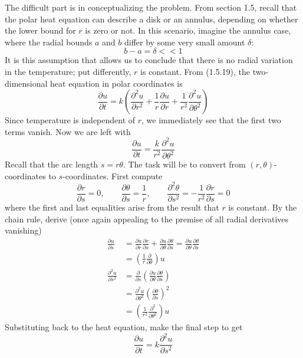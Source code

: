 \documentclass[a4paper]{article}
\begin{document}
The difficult part is in conceptualizing the problem. From section 1.5, recall that the polar heat equation can describe a disk or an annulus, depending on whether the lower bound for \( r \) is zero or not. In this scenario, imagine the annulus case, where the radial bounds \( a \) and \( b \) differ by some very small amount \( \delta \):
\[
	b - a = \delta << 1 
\]
It is this assumption that allows us to conclude that there is no radial variation in the temperature; put differently, \( r \) is constant. From (1.5.19), the two-dimensional heat equation in polar coordinates is
\[
	\frac{\partial u}{\partial t} = k \!\left( \frac{\partial^2 u}{\partial r^2} + \frac{1}{r}\frac{\partial u}{\partial r} + \frac{1}{r^{2}}\frac{\partial^2 u}{\partial \theta^2} \right) 
\]
Since temperature is independent of \( r \), we immediately see that the first two terms vanish. Now we are left with
\[
	\frac{\partial u}{\partial t} = \frac{k}{r^{2}}\frac{\partial^2 u}{\partial \theta^2} 
\]
Recall that the arc length \( s = r \theta \). The task will be to convert from \( \!\left( r,\theta \right) \)-coordinates to \( s \)-coordinates. First compute
\[
	\frac{\partial r}{\partial s} = 0, \qquad \frac{\partial \theta}{\partial s} = \frac{1}{r}, \qquad \frac{\partial^2 \theta}{\partial s^2} = -\frac{1}{r^{2}}\frac{\partial r}{\partial s} = 0
\]
where the first and last equalities arise from the result that \( r \) is constant. By the chain rule, derive (once again appealing to the premise of all radial derivatives vanishing)
\begin{align*}
	\frac{\partial u}{\partial s} & = \frac{\partial u}{\partial r}\frac{\partial r}{\partial s} + \frac{\partial u}{\partial \theta}\frac{\partial \theta}{\partial s} = \frac{\partial u}{\partial \theta}\frac{\partial \theta}{\partial s} \\
	 & = \!\left( \frac{1}{r}\frac{\partial }{\partial \theta} \right)u \\
	\frac{\partial^2 u}{\partial s^2} & = \frac{\partial }{\partial s}\!\left( \frac{\partial u}{\partial \theta}\frac{\partial \theta}{\partial s} \right) \\
					  & = \frac{\partial^2 u}{\partial \theta^2}\!\left(  \frac{\partial \theta}{\partial s} \right)^{2} \\
					  & = \!\left( \frac{1}{r^{2}}\frac{\partial^2 }{\partial \theta^2} \right)u
\end{align*}
Substituting back to the heat equation, make the final step to get
\[
	\frac{\partial u}{\partial t} = k \frac{\partial^2 u}{\partial s^2} 
\]
\end{document}
